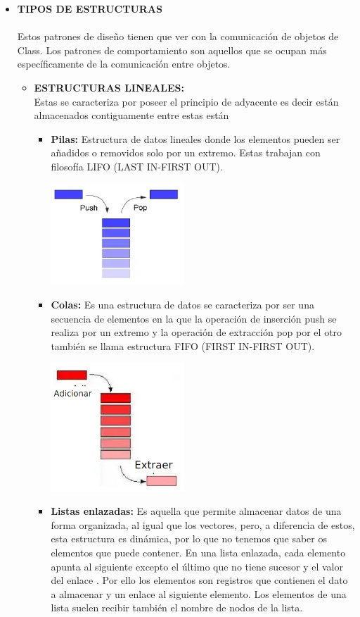 \documentclass[twoside,twocolumn]{article}
\begin{document}
\begin{itemize}
	\item \textbf{TIPOS DE ESTRUCTURAS}
	\\
	\\Estos patrones de diseño tienen que ver con la comunicación de objetos de Class. Los patrones de comportamiento son aquellos que se ocupan más específicamente de la comunicación entre objetos.\cite{r}
	\begin{itemize}
		\item \textbf{ESTRUCTURAS LINEALES:} \\Estas se caracteriza por poseer el principio de adyacente es decir están almacenados contiguamente entre estas están
        \begin{itemize}
            \item \textbf{Pilas:} Estructura de datos lineales donde los elementos pueden ser añadidos o removidos solo por un extremo. Estas trabajan con filosofía LIFO (LAST IN-FIRST OUT).
            \begin{center}
                \includegraphics[width=5cm]{./img/1.png} 
            \end{center}
            \item \textbf{Colas:} Es una estructura de datos se caracteriza por ser una secuencia de elementos en la que la operación de inserción push se realiza por un extremo y la operación de extracción pop por el otro también se llama estructura FIFO (FIRST IN-FIRST OUT).
            \begin{center}
                \includegraphics[width=5cm]{./img/2.png} 
            \end{center}
            \item \textbf{Listas enlazadas:} Es aquella que permite almacenar datos de una forma organizada, al igual que los vectores, pero, a diferencia de estos, esta estructura es dinámica, por lo que no tenemos que saber os elementos que puede contener. En una lista enlazada, cada elemento apunta al siguiente excepto el último que no tiene sucesor y el valor del enlace . Por ello los elementos son registros que contienen el dato a almacenar y un enlace al siguiente elemento. Los elementos de una lista suelen recibir también el nombre de nodos de la lista.

\end{itemize}
\end{itemize}
\end{itemize}
\end{document}
